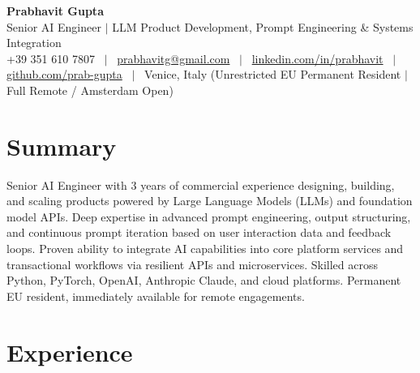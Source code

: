 \documentclass[a4paper,10pt]{article}
\begin{document}
\begin{minipage}[c]{0.80\textwidth}
  {\Huge\bfseries Prabhavit Gupta}\\[3pt]
  {\color{accent}\large Senior AI Engineer $\vert$ LLM Product Development, Prompt Engineering \& Systems Integration}\\[6pt]
  {\footnotesize +39 351 610 7807 ~$\vert$~
  \href{mailto:prabhavitg@gmail.com}{prabhavitg@gmail.com} ~$\vert$~
  \href{https://www.linkedin.com/in/prabhavit/}{linkedin.com/in/prabhavit} ~$\vert$~
  \href{https://github.com/prab-gupta}{github.com/prab-gupta} ~$\vert$~
  Venice, Italy (Unrestricted EU Permanent Resident $\vert$ Full Remote / Amsterdam Open)}
\end{minipage}\hfill

\section{Summary}
Senior AI Engineer with 3 years of commercial experience designing, building, and scaling products powered by Large Language Models (LLMs) and foundation model APIs. Deep expertise in advanced prompt engineering, output structuring, and continuous prompt iteration based on user interaction data and feedback loops. Proven ability to integrate AI capabilities into core platform services and transactional workflows via resilient APIs and microservices. Skilled across Python, PyTorch, OpenAI, Anthropic Claude, and cloud platforms. Permanent EU resident, immediately available for remote engagements.

\section{Experience}
\end{document}
